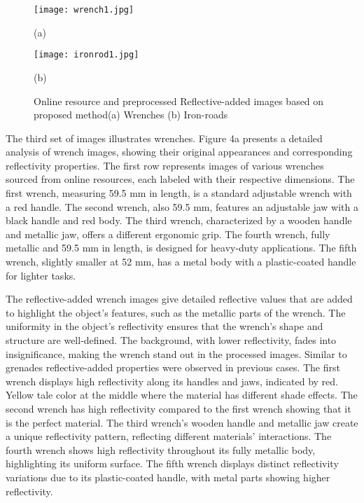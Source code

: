 \documentclass[journal,article,submit,pdftex,moreauthors]{Definitions/mdpi}
\begin{document}
\begin{figure}[h]
    \centering
    \begin{minipage}{0.49\textwidth}
        \centering
        \texttt{[image: wrench1.jpg]}
        \caption*{(a)}
    \end{minipage}
    \hfill
    \begin{minipage}{0.49\textwidth}
        \centering
        \texttt{[image: ironrod1.jpg]}
        \caption*{(b)}
    \end{minipage}
    \caption{Online resource and preprocessed Reflective-added images based on proposed method(a) Wrenches    (b) Iron-roads }
    \label{fig:side_by_side}
\end{figure}







The third set of images illustrates wrenches. Figure 4a presents a detailed analysis of wrench images, showing their original appearances and corresponding reflectivity properties. The first row represents images of various wrenches sourced from online resources, each labeled with their respective dimensions. The first wrench, measuring 59.5 mm in length, is a standard adjustable wrench with a red handle. The second wrench, also 59.5 mm, features an adjustable jaw with a black handle and red body. The third wrench, characterized by a wooden handle and metallic jaw, offers a different ergonomic grip. The fourth wrench, fully metallic and 59.5 mm in length, is designed for heavy-duty applications. The fifth wrench, slightly smaller at 52 mm, has a metal body with a plastic-coated handle for lighter tasks.

The reflective-added wrench images give detailed reflective values that are added to highlight the object's features, such as the metallic parts of the wrench. The uniformity in the object's reflectivity ensures that the wrench's shape and structure are well-defined. The background, with lower reflectivity, fades into insignificance, making the wrench stand out in the processed images. Similar to grenades reflective-added properties were observed in previous cases. The first wrench displays high reflectivity along its handles and jaws, indicated by red. Yellow tale color at the middle where the material has different shade effects. The second wrench has high reflectivity compared to the first wrench showing that it is the perfect material. The third wrench's wooden handle and metallic jaw create a unique reflectivity pattern, reflecting different materials' interactions. The fourth wrench shows high reflectivity throughout its fully metallic body, highlighting its uniform surface. The fifth wrench displays distinct reflectivity variations due to its plastic-coated handle, with metal parts showing higher reflectivity.
\end{document}
